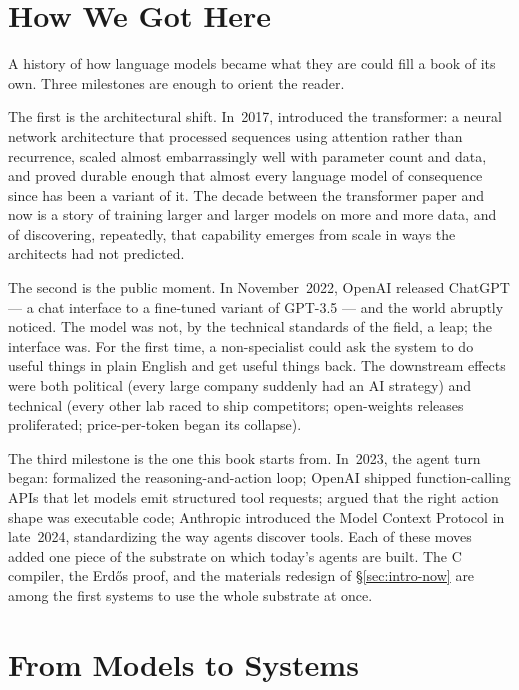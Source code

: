 \section{How We Got Here}
\label{sec:intro-history}

A history of how language models became what they are could fill a
book of its own. Three milestones are enough to orient the reader.

The first is the architectural shift. In~2017,
\citet{vaswani2017attention} introduced the transformer: a neural
network architecture that processed sequences using attention
rather than recurrence, scaled almost embarrassingly well with
parameter count and data, and proved durable enough that almost
every language model of consequence since has been a variant of it.
The decade between the transformer paper and now is a story of
training larger and larger models on more and more data, and of
discovering, repeatedly, that capability emerges from scale in ways
the architects had not predicted.

The second is the public moment. In November~2022, OpenAI released
ChatGPT --- a chat interface to a fine-tuned variant of GPT-3.5 ---
and the world abruptly noticed. The model was not, by the technical
standards of the field, a leap; the interface was. For the first
time, a non-specialist could ask the system to do useful things in
plain English and get useful things back. The downstream effects
were both political (every large company suddenly had an AI
strategy) and technical (every other lab raced to ship competitors;
open-weights releases proliferated; price-per-token began its
collapse).

The third milestone is the one this book starts from. In~2023, the
agent turn began: \citet{yao2023react} formalized the
reasoning-and-action loop; OpenAI shipped function-calling APIs that
let models emit structured tool requests; \citet{wang2024codeact}
argued that the right action shape was executable code; Anthropic
introduced the Model Context Protocol in late~2024, standardizing
the way agents discover tools. Each of these moves added one piece
of the substrate on which today's agents are built. The C compiler,
the Erd\H{o}s proof, and the materials redesign of
\S\ref{sec:intro-now} are among the first systems to use the whole
substrate at once.

\section{From Models to Systems}
\label{sec:intro-systems}

